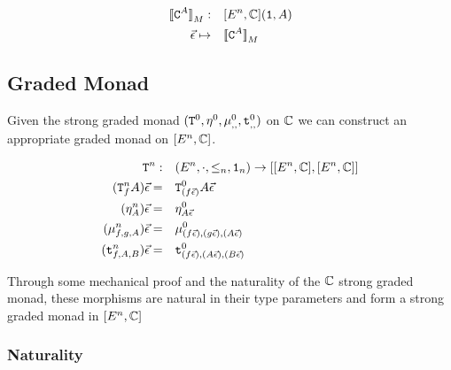\documentclass{report}
\begin{document}
\begin{align}
    {\bf [\![}\texttt{C}^{A}{\bf ]\!]}_M:&\quad[E^n, \mathbb{C}](\texttt{1}, A)\\
    \vec{\epsilon}\mapsto&\quad{\bf [\![}\texttt{C}^{A}{\bf ]\!]}_M
\end{align}

\subsection{Graded Monad}
Given the strong graded monad $(\texttt{T}^0_{}, \eta_{}^0{}{}, \mu_{, , }^0, \texttt{t}_{, , }^0)$ on $\mathbb{C}$ we can construct an appropriate graded monad on $[E^n, \mathbb{C}]$.

\begin{align}
    \texttt{T}^n_{}:&\quad(E^n, \cdot, \leq_n, \texttt{1}_n) \rightarrow [[E^n, \mathbb{C}], [E^n, \mathbb{C}]]\\
    (\texttt{T}^n_{f}A)\vec{\epsilon}=&\quad \texttt{T}^0_{(f\vec{\epsilon})}A\vec{\epsilon}\\
    (\eta_{A}^n)\vec{\epsilon}=&\quad\eta_{A\vec{\epsilon}}^0\\
    (\mu_{f, g, A}^n)\vec{\epsilon}=&\quad\mu_{(f\vec{\epsilon}), (g\vec{\epsilon}), (A\vec{\epsilon})}^0\\
    (\texttt{t}_{f, A, B}^n)\vec{\epsilon}=&\quad\texttt{t}_{(f\vec{\epsilon}), (A\vec{\epsilon}), (B\vec{\epsilon})}^0
\end{align}

Through some mechanical proof and the naturality of the $\mathbb{C}$ strong graded monad, these morphisms are natural in their type parameters and form a strong graded monad in $[E^n, \mathbb{C}]$


\subsubsection{Naturality}


\end{document}
